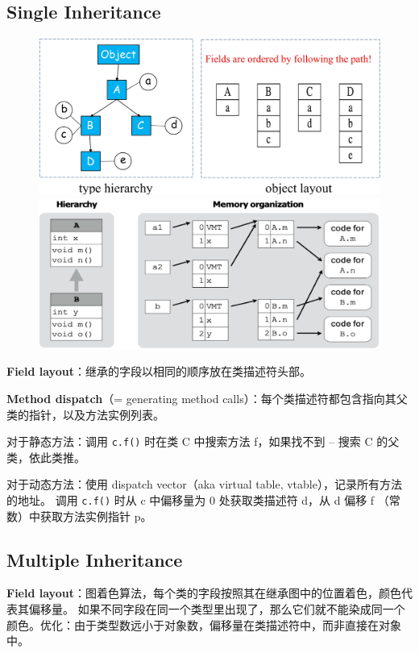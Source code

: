 \subsection*{Single Inheritance}

\begin{figure}[H]
    \centering
    \includegraphics[width=0.40\linewidth]{figures/oop1.png}
    \includegraphics[width=0.58\linewidth]{figures/oop2.png}
\end{figure}

\par \noindent \textbf{Field layout}：继承的字段以相同的顺序放在类描述符头部。

\par \noindent \textbf{Method dispatch}（= generating method calls）：每个类描述符都包含指向其父类的指针，以及方法实例列表。
\par \noindent 对于静态方法：调用 \texttt{c.f()} 时在类 C 中搜索方法 f，如果找不到 – 搜索 C 的父类，依此类推。
\par \noindent 对于动态方法：使用 dispatch vector（aka virtual table, vtable），记录所有方法的地址。
调用 \texttt{c.f()} 时从 c 中偏移量为 0 处获取类描述符 d，从 d 偏移 f （常数）中获取方法实例指针 p。

\subsection*{Multiple Inheritance}

\par \noindent \textbf{Field layout}：图着色算法，每个类的字段按照其在继承图中的位置着色，颜色代表其偏移量。
如果不同字段在同一个类型里出现了，那么它们就不能染成同一个颜色。优化：由于类型数远小于对象数，偏移量在类描述符中，而非直接在对象中。

